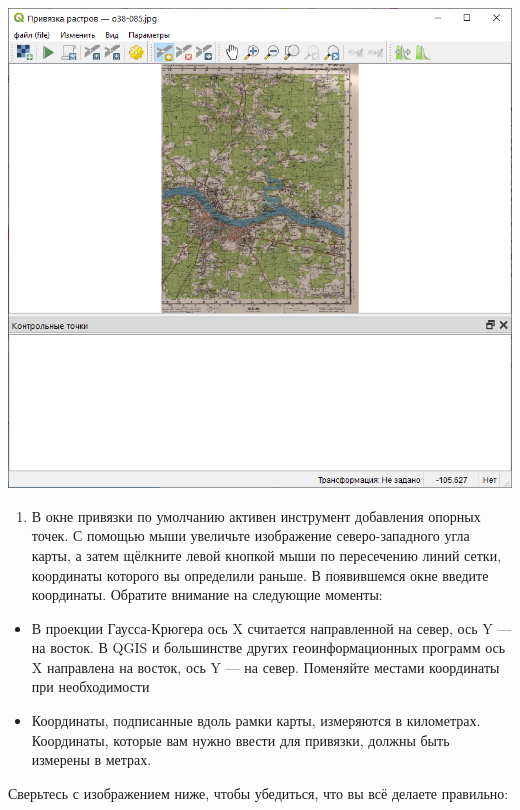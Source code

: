 \documentclass[
  12pt,
]{book}
\providecommand{\tightlist}{%
  \setlength{\itemsep}{0pt}\setlength{\parskip}{0pt}}
\begin{document}
\includegraphics{images/Ex05_Reference/RasterReference1.png}

\begin{enumerate}
\def\labelenumi{\arabic{enumi}.}
\setcounter{enumi}{6}
\tightlist
\item
  В окне привязки по умолчанию активен инструмент добавления опорных точек. С помощью мыши увеличьте изображение северо-западного угла карты, а затем щёлкните левой кнопкой мыши по пересечению линий сетки, координаты которого вы определили раньше. В появившемся окне введите координаты. Обратите внимание на следующие моменты:
\end{enumerate}

\begin{itemize}
\tightlist
\item
  В проекции Гаусса-Крюгера ось X считается направленной на север, ось Y --- на восток. В QGIS и большинстве других геоинформационных программ ось X направлена на восток, ось Y --- на север. Поменяйте местами координаты при необходимости
\item
  Координаты, подписанные вдоль рамки карты, измеряются в километрах. Координаты, которые вам нужно ввести для привязки, должны быть измерены в метрах.
\end{itemize}

Сверьтесь с изображением ниже, чтобы убедиться, что вы всё делаете правильно:
\end{document}
